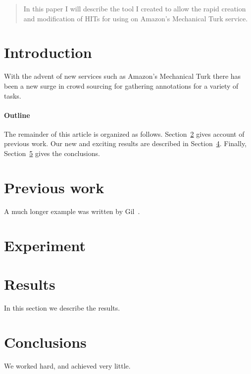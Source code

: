 \documentclass[11pt]{article}
\begin{document}
\maketitle

\begin{abstract}
In this paper I will describe the tool I created to allow the rapid creation and modification of HITs for using on Amazon's Mechanical Turk service.
\end{abstract}

\section{Introduction}
With the advent of new services such as Amazon's Mechanical Turk there has been a new surge in crowd sourcing for gathering annotations for a variety of tasks.

\paragraph{Outline}
The remainder of this article is organized as follows.
Section~\ref{previous work} gives account of previous work.
Our new and exciting results are described in Section~\ref{results}.
Finally, Section~\ref{conclusions} gives the conclusions.

\section{Previous work}\label{previous work}
A much longer \LaTeXe{} example was written by Gil~\cite{Gil:02}.

\section{Experiment}\label{experiment}

\section{Results}\label{results}
In this section we describe the results.

\section{Conclusions}\label{conclusions}
We worked hard, and achieved very little.



\end{document}
